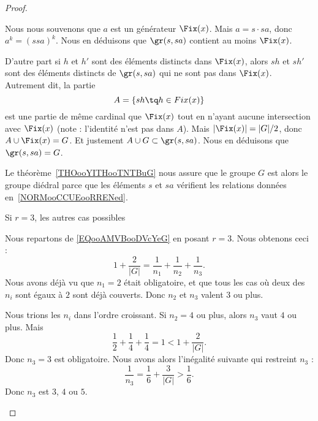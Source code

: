 \begin{proof}
\begin{subproof}
                Nous nous souvenons que \( a\) est un générateur \( \Fix(x)\). Mais \( a=s\cdot sa\), donc \( a^k=(ssa)^k\). Nous en déduisons que \( \gr(s,sa)\) contient au moins \( \Fix(x)\).

                D'autre part si \( h\) et \( h'\) sont des éléments distincts dans \( \Fix(x)\), alors \( sh\) et \( sh'\) sont des éléments distincts de \( \gr(s,sa)\) qui ne sont pas dans \( \Fix(x)\). Autrement dit, la partie
                \begin{equation}
                    A=\{ sh\tq h\in Fix(x) \}
                \end{equation}
                est une partie de même cardinal que \( \Fix(x)\) tout en n'ayant aucune intersection avec \( \Fix(x)\) (note : l'identité n'est pas dans \( A\)). Mais \( | \Fix(x) |=| G |/2\), donc \( A\cup\Fix(x)=G\). Et justement \( A\cup G\subset \gr(s,sa)\). Nous en déduisons que \( \gr(s,sa)=G\).

                Le théorème~\ref{THOooYITHooTNTBuG} nous assure que le groupe \( G\) est alors le groupe diédral parce que les éléments \( s\) et \( sa\) vérifient les relations données en~\ref{NORMooCCUEooRRENed}.

            \item[Si \( r=3\), les autres cas possibles]

                Nous repartons de \eqref{EQooAMVBooDVcYeG} en posant \( r=3\). Nous obtenons ceci :
                \begin{equation}
                    1+\frac{ 2 }{ | G | }=\frac{1}{ n_1 }+\frac{1}{ n_2 }+\frac{1}{ n_3 }.
                \end{equation}
                Nous avons déjà vu que \( n_1=2\) était obligatoire, et que tous les cas où deux des \( n_i\) sont égaux à \( 2\) sont déjà couverts. Donc \( n_2\) et \( n_3\) valent \( 3\) ou plus.

                Nous trions les \( n_i\) dans l'ordre croissant. Si \( n_2=4\) ou plus, alors \( n_3\) vaut \( 4\) ou plus. Mais
                \begin{equation}
                    \frac{ 1 }{2}+\frac{1}{ 4 }+\frac{1}{ 4 }=1<1+\frac{ 2 }{ | G | }.
                \end{equation}
                Donc \( n_3=3\) est obligatoire. Nous avons alors l'inégalité suivante qui restreint \( n_3\) :
                \begin{equation}
                    \frac{1}{ n_3 }=\frac{1}{ 6 }+\frac{ 3 }{ | G | }>\frac{1}{ 6 }.
                \end{equation}
                Donc \( n_3\) est \( 3\), \( 4\) ou \( 5\).


\end{subproof}
\end{proof}
